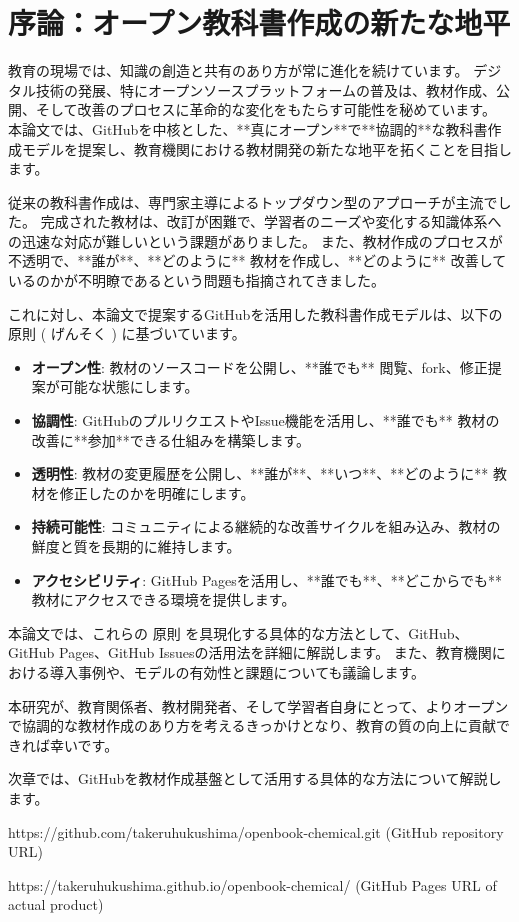\section{序論：オープン教科書作成の新たな地平}

教育の現場では、知識の創造と共有のあり方が常に進化を続けています。
デジタル技術の発展、特にオープンソースプラットフォームの普及は、教材作成、公開、そして改善のプロセスに革命的な変化をもたらす可能性を秘めています。
本論文では、GitHubを中核とした、**真にオープン**で**協調的**な教科書作成モデルを提案し、教育機関における教材開発の新たな地平を拓くことを目指します。

従来の教科書作成は、専門家主導によるトップダウン型のアプローチが主流でした。
完成された教材は、改訂が困難で、学習者のニーズや変化する知識体系への迅速な対応が難しいという課題がありました。
また、教材作成のプロセスが不透明で、**誰が**、**どのように** 教材を作成し、**どのように** 改善しているのかが不明瞭であるという問題も指摘されてきました。

これに対し、本論文で提案するGitHubを活用した教科書作成モデルは、以下の 原則 ( げんそく ) に基づいています。

\begin{itemize}
    \item \textbf{オープン性}: 教材のソースコードを公開し、**誰でも** 閲覧、fork、修正提案が可能な状態にします。
    \item \textbf{協調性}: GitHubのプルリクエストやIssue機能を活用し、**誰でも** 教材の改善に**参加**できる仕組みを構築します。
    \item \textbf{透明性}: 教材の変更履歴を公開し、**誰が**、**いつ**、**どのように** 教材を修正したのかを明確にします。
    \item \textbf{持続可能性}: コミュニティによる継続的な改善サイクルを組み込み、教材の鮮度と質を長期的に維持します。
    \item \textbf{アクセシビリティ}: GitHub Pagesを活用し、**誰でも**、**どこからでも** 教材にアクセスできる環境を提供します。
\end{itemize}

本論文では、これらの 原則 を具現化する具体的な方法として、GitHub、GitHub Pages、GitHub Issuesの活用法を詳細に解説します。
また、教育機関における導入事例や、モデルの有効性と課題についても議論します。

本研究が、教育関係者、教材開発者、そして学習者自身にとって、よりオープンで協調的な教材作成のあり方を考えるきっかけとなり、教育の質の向上に貢献できれば幸いです。

次章では、GitHubを教材作成基盤として活用する具体的な方法について解説します。

https://github.com/takeruhukushima/openbook-chemical.git  (GitHub repository URL)

https://takeruhukushima.github.io/openbook-chemical/  (GitHub Pages URL of actual product)
